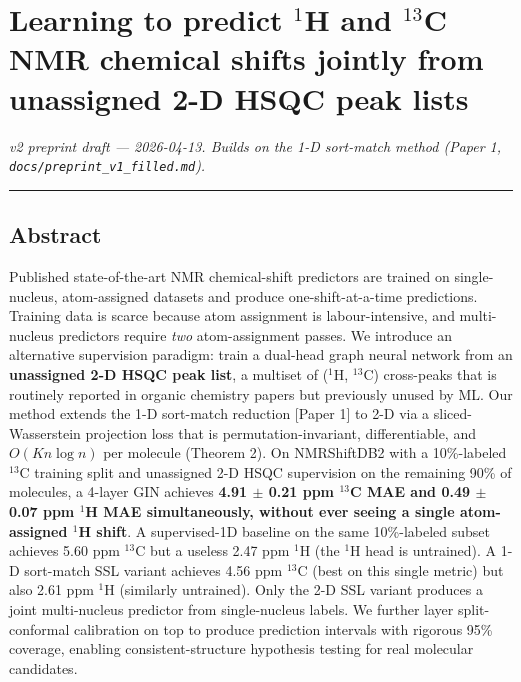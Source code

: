 \section{\texorpdfstring{Learning to predict \(^{1}\)H and \(^{13}\)C NMR chemical shifts jointly from unassigned 2-D HSQC peak lists}{Learning to predict \^{}\{1\}H and \^{}\{13\}C NMR chemical shifts jointly from unassigned 2-D HSQC peak lists}}\label{learning-to-predict-1h-and-13c-nmr-chemical-shifts-jointly-from-unassigned-2-d-hsqc-peak-lists}

\emph{v2 preprint draft --- 2026-04-13. Builds on the 1-D sort-match method (Paper 1, \texttt{docs/preprint\_v1\_filled.md}).}

\begin{center}\rule{0.5\linewidth}{0.5pt}\end{center}

\subsection{Abstract}\label{abstract}

Published state-of-the-art NMR chemical-shift predictors are trained on single-nucleus, atom-assigned datasets and produce one-shift-at-a-time predictions. Training data is scarce because atom assignment is labour-intensive, and multi-nucleus predictors require \emph{two} atom-assignment passes. We introduce an alternative supervision paradigm: train a dual-head graph neural network from an \textbf{unassigned 2-D HSQC peak list}, a multiset of (\(^{1}\)H, \(^{13}\)C) cross-peaks that is routinely reported in organic chemistry papers but previously unused by ML. Our method extends the 1-D sort-match reduction {[}Paper 1{]} to 2-D via a sliced-Wasserstein projection loss that is permutation-invariant, differentiable, and \(O(K n \log n)\) per molecule (Theorem 2). On NMRShiftDB2 with a 10\%-labeled \(^{13}\)C training split and unassigned 2-D HSQC supervision on the remaining 90\% of molecules, a 4-layer GIN achieves \textbf{4.91 \(\pm\) 0.21 ppm \(^{13}\)C MAE and 0.49 \(\pm\) 0.07 ppm \(^{1}\)H MAE simultaneously, without ever seeing a single atom-assigned \(^{1}\)H shift}. A supervised-1D baseline on the same 10\%-labeled subset achieves 5.60 ppm \(^{13}\)C but a useless 2.47 ppm \(^{1}\)H (the \(^{1}\)H head is untrained). A 1-D sort-match SSL variant achieves 4.56 ppm \(^{13}\)C (best on this single metric) but also 2.61 ppm \(^{1}\)H (similarly untrained). Only the 2-D SSL variant produces a joint multi-nucleus predictor from single-nucleus labels. We further layer split-conformal calibration on top to produce prediction intervals with rigorous 95\% coverage, enabling consistent-structure hypothesis testing for real molecular candidates.

